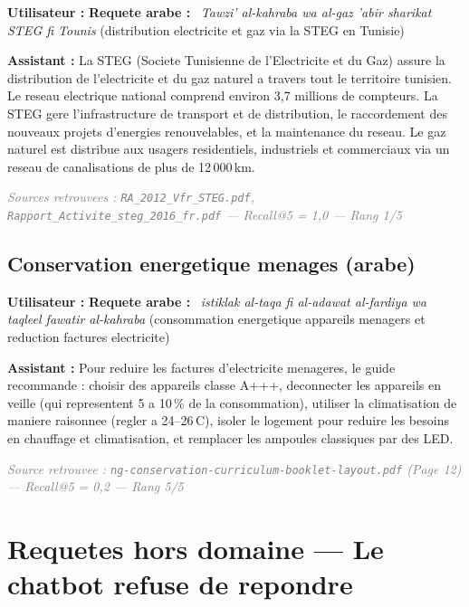 \documentclass[12pt,a4paper,oneside]{article}
\newcommand{\prompt}[1]{%
  \noindent\colorbox{PromptBg}{\parbox{\dimexpr\linewidth-2\fboxsep}{%
    \small\textbf{\textcolor{MainBlue}{Utilisateur :}} #1%
  }}\vspace{3pt}%
}
\newcommand{\botreply}[1]{%
  \noindent\colorbox{OutputBg}{\parbox{\dimexpr\linewidth-2\fboxsep}{%
    \small\textbf{\textcolor{PassGreen!70!black}{Assistant :}} #1%
  }}\vspace{6pt}%
}
\begin{document}
\prompt{\textbf{Requete arabe :} ~\textit{Tawzi' al-kahraba wa al-gaz 'abir sharikat STEG fi Tounis} (distribution electricite et gaz via la STEG en Tunisie)}

\botreply{
La STEG (Societe Tunisienne de l'Electricite et du Gaz) assure la distribution de l'electricite et du gaz naturel a travers tout le territoire tunisien. Le reseau electrique national comprend environ 3,7 millions de compteurs. La STEG gere l'infrastructure de transport et de distribution, le raccordement des nouveaux projets d'energies renouvelables, et la maintenance du reseau. Le gaz naturel est distribue aux usagers residentiels, industriels et commerciaux via un reseau de canalisations de plus de 12\,000\,km.
}

\noindent\small\textit{\textcolor{gray}{Sources retrouvees : \texttt{RA\_2012\_Vfr\_STEG.pdf}, \texttt{Rapport\_Activite\_steg\_2016\_fr.pdf} --- Recall@5 = 1,0 --- Rang 1/5}}

\bigskip

\subsection{Conservation energetique menages (arabe)}

\prompt{\textbf{Requete arabe :} ~\textit{istiklak al-taqa fi al-adawat al-fardiya wa taqleel fawatir al-kahraba} (consommation energetique appareils menagers et reduction factures electricite)}

\botreply{
Pour reduire les factures d'electricite menageres, le guide recommande : choisir des appareils classe A+++, deconnecter les appareils en veille (qui representent 5 a 10\,\% de la consommation), utiliser la climatisation de maniere raisonnee (regler a 24--26\,\degres C), isoler le logement pour reduire les besoins en chauffage et climatisation, et remplacer les ampoules classiques par des LED.
}

\noindent\small\textit{\textcolor{gray}{Source retrouvee : \texttt{ng-conservation-curriculum-booklet-layout.pdf} (Page 12) --- Recall@5 = 0,2 --- Rang 5/5}}

\clearpage

\section{Requetes hors domaine --- Le chatbot refuse de repondre}
\end{document}
